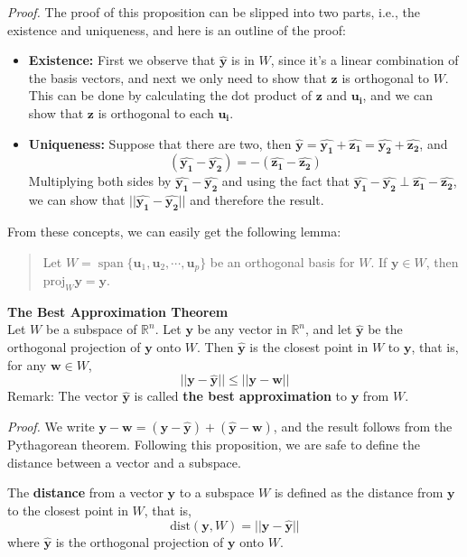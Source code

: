 \documentclass[10pt, a4paper]{article}
\newcommand{\R}{\mathbb{R}}
\newcommand{\vt}[1]{\mathbf{#1}}
\begin{document}
\indent \textit{Proof.} The proof of this proposition can be slipped into two parts, i.e., the existence and uniqueness, and here is an outline of the proof:
\begin{itemize}
    \item \textbf{Existence:} First we observe that $\hat{\vt{y}}$ is in $W$, since it's a linear combination of the basis vectors, and next we only need to show that $\vt{z}$ is orthogonal to $W$. This can be done by calculating the dot product of $\vt{z}$ and $\vt{u_i}$, and we can show that $\vt{z}$ is orthogonal to each $\vt{u_i}$.
    \item \textbf{Uniqueness:} Suppose that there are two, then $\hat{\vt{y}}=\hat{\vt{y_1}}+\hat{\vt{z_1}}=\hat{\vt{y_2}}+\hat{\vt{z_2}}$, and \[
    (\hat{\vt{y_1}}-\hat{\vt{y_2}})=-(\hat{\vt{z_1}}-\hat{\vt{z_2}})
    \]
    Multiplying both sides by $\hat{\vt{y_1}}-\hat{\vt{y_2}}$ and using the fact that $\hat{\vt{y_1}}-\hat{\vt{y_2}} \perp \hat{\vt{z_1}}-\hat{\vt{z_2}}$,
    we can show that $||\hat{\vt{y_1}}-\hat{\vt{y_2}}||$ and therefore the result.
\end{itemize}
\indent\indent From these concepts, we can easily get the following lemma:
\begin{quotation}
    Let $W=\operatorname*{span} \{\vt{u}_1, \vt{u}_2, \cdots, \vt{u}_p\}$ be an orthogonal basis for $W$. If $\vt{y}\in W$, then $\text{proj}_W\vt{y} = \vt{y}$.
\end{quotation}
\begin{proposition}
    \textbf{The Best Approximation Theorem}\\
    Let $W$ be a subspace of $\R^n$. Let $\vt{y}$ be any vector in $\R^n$, and let $\hat{\vt{y}}$ be the orthogonal projection of $\vt{y}$ onto $W$. Then $\hat{\vt{y}}$ is the closest point in $W$ to $\vt{y}$, that is, for any $\vt{w}\in W$,\[
    ||\vt{y}-\hat{\vt{y}}||\leq||\vt{y}-\vt{w}||
    \]
    Remark: The vector $\hat{\vt{y}}$ is called \textbf{the best approximation} to $\vt{y}$ from $W$.
\end{proposition}
\indent\indent \textit{Proof.} We write $\vt{y}-\vt{w}=(\vt{y}-\hat{\vt{y}})+(\hat{\vt{y}}-\vt{w})$, and the result follows from the Pythagorean theorem. 
\indent Following this proposition, we are safe to define the distance between a vector and a subspace.
\begin{definition}
    The \textbf{distance} from a vector $\vt{y}$ to a subspace $W$ is defined as the distance from $\vt{y}$ to the closest point in $W$, that is,\[
    \text{dist}(\vt{y},W) = ||\vt{y}-\hat{\vt{y}}||
    \]
    where $\hat{\vt{y}}$ is the orthogonal projection of $\vt{y}$ onto $W$.
\end{definition}
\end{document}
